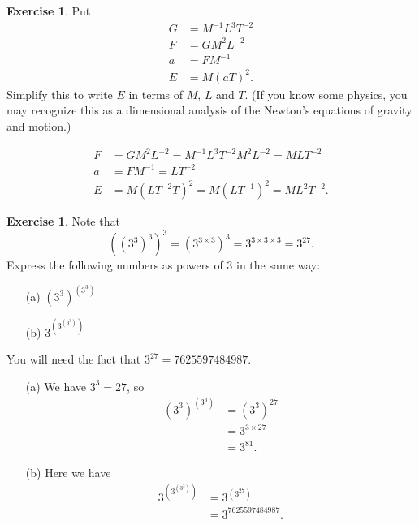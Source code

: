 \documentclass[a4paper]{book}
\newcommand{\tm}        {\times}
\renewcommand{\:}{\colon}
\theoremstyle{definition}
\newtheorem{exercise}[theorem]{Exercise}
\renewenvironment{solution}{\SolutionInline}{\endSolutionInline}
\begin{document}
\begin{exercise}
 Put 
 \begin{align*}
  G &= M^{-1}L^3T^{-2} \\
  F &= GM^2L^{-2} \\
  a &= FM^{-1} \\
  E &= M(aT)^2.  
 \end{align*}
 Simplify this to write $E$ in terms of $M$, $L$ and $T$.  (If you
 know some physics, you may recognize this as a dimensional analysis
 of the Newton's equations of gravity and motion.) 
\end{exercise}
\begin{solution}
 \begin{align*}
  F &= GM^2L^{-2} = M^{-1}L^3T^{-2}M^2L^{-2} = MLT^{-2} \\
  a &= FM^{-1} = LT^{-2} \\
  E &= M(LT^{-2}T)^2 = M(LT^{-1})^2 = ML^2T^{-2}.
 \end{align*}
\end{solution}
\begin{exercise}
 Note that
 {\Large
  \[ \left(\left(3^3\right)^3\right)^3 =
      \left(3^{3\tm 3}\right)^3 =
       3^{3\tm 3\tm 3} = 3^{27}.
  \]}
 Express the following numbers as powers of $3$ in the same way:
 \begin{itemize}
  \item[(a)] {\Large $\left(3^3\right)^{\left(3^3\right)}$}
  \item[(b)] {\Large $3^{\left(3^{\left(3^3\right)}\right)}$}
 \end{itemize}
 You will need the fact that $3^{27}=7625597484987$.
\end{exercise}
\begin{solution}
 \begin{itemize}
  \item[(a)] We have $3^3=27$, so 
   {\Large
     \begin{align*}
      \left(3^3\right)^{\left(3^3\right)}
      &= \left(3^3\right)^{27} \\
      &= 3^{3\tm 27} \\
      &= 3^{81}.
     \end{align*}
   }
  \item[(b)] Here we have
   {\Large \begin{align*}
    3^{\left(3^{\left(3^3\right)}\right)} &=
     3^{\left(3^{27}\right)} \\
     &= 3^{7625597484987}.
   \end{align*}}
 \end{itemize}
\end{solution}
\end{document}
